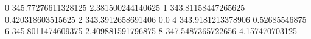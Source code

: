 0 345.77276611328125 2.381500244140625
1 343.81158447265625 0.420318603515625
2 343.3912658691406 0.0
4 343.9181213378906 0.52685546875
6 345.8011474609375 2.409881591796875
8 347.5487365722656 4.157470703125
